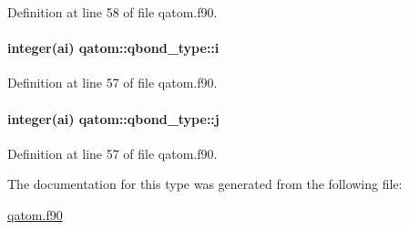 Definition at line 58 of file qatom.\-f90.

\hypertarget{structqatom_1_1qbond__type_a3660ec38d3107d468a2bb3597f1c91c6}{
\paragraph[{i}]{\setlength{\rightskip}{0pt plus 5cm}integer(ai) qatom\-::qbond\-\_\-type\-::i}}\label{structqatom_1_1qbond__type_a3660ec38d3107d468a2bb3597f1c91c6}


Definition at line 57 of file qatom.\-f90.

\hypertarget{structqatom_1_1qbond__type_a94de62ec7d722ec75f10629975e8c579}{
\paragraph[{j}]{\setlength{\rightskip}{0pt plus 5cm}integer(ai) qatom\-::qbond\-\_\-type\-::j}}\label{structqatom_1_1qbond__type_a94de62ec7d722ec75f10629975e8c579}


Definition at line 57 of file qatom.\-f90.



The documentation for this type was generated from the following file\-:\begin{DoxyCompactItemize}
\item 
\hyperlink{qatom_8f90}{qatom.\-f90}\end{DoxyCompactItemize}
